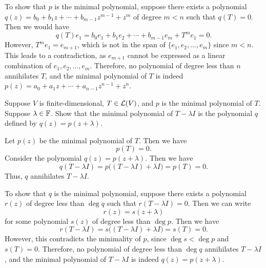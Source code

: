 \begin{exc}
\begin{solution}
To show that $p$ is the minimal polynomial, suppose there exists a polynomial
$q(z)=b_0+b_1z+\cdots+b_{m-1}z^{m-1}+z^m$ of degree $m<n$ such that $q(T)=0$.
Then we would have
\[ q(T)e_1=b_0e_1+b_1e_2+\cdots+b_{m-1}e_m+T^me_1=0. \]
However, $T^me_1=e_{m+1}$, which is not in the span of $\{e_1,e_2,\dots,e_m\}$
since $m<n$. This leads to a contradiction, as $e_{m+1}$ cannot be expressed
as a linear combination of $e_1,e_2,\dots,e_m$. Therefore, no polynomial of
degree less than $n$ annihilates $T$, and the minimal polynomial of $T$ is
indeed $p(z)=a_0+a_1z+\cdots+a_{n-1}z^{n-1}+z^n$.
\end{solution}

\begin{exercise}
Suppose $V$ is finite-dimensional, $T\in\mathcal{L}(V)$, and $p$ is the minimal
polynomial of $T$. Suppose $\lambda\in\mathbb{F}$. Show that the minimal polynomial of
$T-\lambda I$ is the polynomial $q$ defined by $q(z)=p(z+\lambda)$.
\end{exercise}
\begin{solution}
Let $p(z)$ be the minimal polynomial of $T$. Then we have
\[ p(T)=0. \]
Consider the polynomial $q(z)=p(z+\lambda)$. Then we have
\[ q(T-\lambda I)=p\bigl((T-\lambda I)+\lambda I\bigr)=p(T)=0. \]
Thus, $q$ annihilates $T-\lambda I$.

To show that $q$ is the minimal polynomial, suppose there exists a polynomial
$r(z)$ of degree less than $\deg q$ such that $r(T-\lambda I)=0$. Then we can
write
\[ r(z)=s(z+\lambda) \]
for some polynomial $s(z)$ of degree less than $\deg p$. Then we have
\[ r(T-\lambda I)=s\bigl((T-\lambda I)+\lambda I\bigr)=s(T)=0. \]
However, this contradicts the minimality of $p$, since $\deg s<\deg p$ and
$s(T)=0$. Therefore, no polynomial of degree less than $\deg q$ annihilates
$T-\lambda I$, and the minimal polynomial of $T-\lambda I$ is indeed
$q(z)=p(z+\lambda)$.
\end{solution}


\end{exc}
